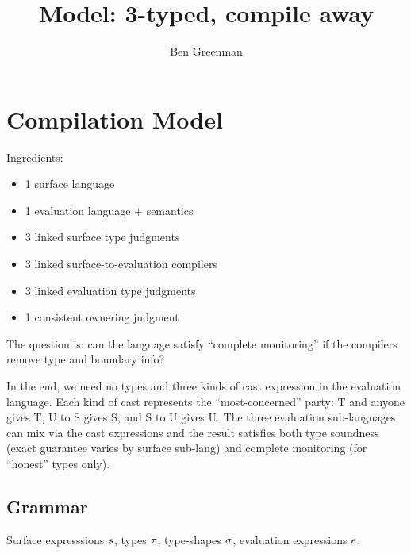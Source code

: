 \documentclass[nonacm,10pt]{acmart}
\title{Model: 3-typed, compile away}
\author{Ben Greenman}
\begin{document}
\maketitle


\section{Compilation Model}

Ingredients:

\begin{itemize}
\item 1 surface language
\item 1 evaluation language + semantics
\item 3 linked surface type judgments
\item 3 linked surface-to-evaluation compilers
\item 3 linked evaluation type judgments
\item 1 consistent ownering judgment
\end{itemize}

The question is: can the language satisfy ``complete monitoring''
 if the compilers remove type and boundary info?

In the end, we need no types and three kinds of cast expression in the
 evaluation language.
Each kind of cast represents the ``most-concerned'' party:
 T and anyone gives T, U to S gives S, and S to U gives U.
The three evaluation sub-languages can mix via the cast expressions and the
 result satisfies both type soundness (exact guarantee varies by surface sub-lang)
 and complete monitoring (for ``honest'' types only).


\subsection{Grammar}

Surface expresssions $s$,
 types $\tau$,
 type-shapes $\sigma$,
 evaluation expressions $e$.
\end{document}
